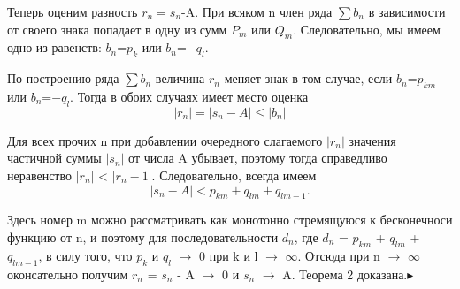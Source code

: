 \par Теперь оценим разность $r_n=s_n$-A. При всяком n член ряда $\sum b_n$ в зависимости от своего знака попадает в одну из сумм $P_m$ или $Q_m$. Следовательно, мы имеем одно из равенств: $b_n$=$p_k$ или $b_n$=$-q_l$.
\par По построению ряда $\sum b_n$ величина $r_n$ меняет знак в том случае, если $b_n$=$p_{km}$ или $b_n$=$-q_l$. Тогда в обоих случаях имеет место оценка
$$ |r_n| = |s_n - A| \leq |b_n| $$
\par Для всех прочих n при добавлении очередного слагаемого $|r_n|$ значения частичной суммы $|s_n|$ от числа A убывает, поэтому тогда справедливо неравенство $|r_n|$ < $|r_n-1|$. Следовательно, всегда имеем
$$ |s_n-A| < p_{km} + q_{lm} + q_{lm-1}. $$
\par Здесь номер m можно рассматривать как монотонно стремящуюся к бесконечноси функцию от n, и поэтому для последовательности $d_n$, где $d_n$ = $p_{km}$ + $q_{lm}$ + $q_{lm-1}$, в силу того, что $p_k$ и $q_l$ $\rightarrow$ 0 при k и l $\rightarrow$ $\infty$. Отсюда при n $\rightarrow$ $\infty$ оконсательно получим $r_n$ = $s_n$ - A $\rightarrow$ 0 и $s_n$ $\rightarrow$ A. Теорема 2 доказана.$\blacktriangleright$

